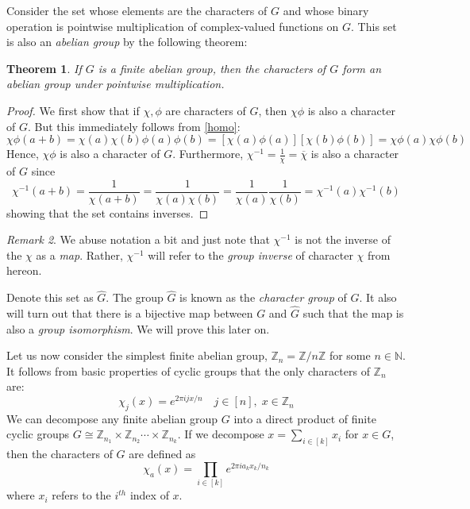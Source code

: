 \documentclass{amsart}
\newtheorem{theorem}{Theorem}[section]
\theoremstyle{definition}
\theoremstyle{remark}
\newtheorem{remark}[theorem]{Remark}
\numberwithin{equation}{section}
\theoremstyle{remark}
\begin{document}
Consider the set whose elements are the characters of $G$ and whose binary operation is pointwise multiplication of complex-valued functions on $G$. This set is also an \emph{abelian group} by the following theorem:
%
\begin{theorem}
  If $G$ is a finite abelian group, then the characters of $G$ form an abelian group under pointwise multiplication.
\end{theorem}
%
\begin{proof}
  We first show that if $\chi, \phi$ are characters of $G$, then $\chi\phi$ is also a character of $G$. But this immediately follows from \ref{homo}:
  $$ \chi\phi(a+b) = \chi(a)\chi(b)\phi(a)\phi(b) = [\chi(a)\phi(a)][\chi(b)\phi(b)] = \chi\phi(a)\chi\phi(b)$$
  Hence, $\chi\phi$ is also a character of $G$. Furthermore, $\chi^{-1} = \frac{1}{\chi} = \overline{\chi}$ is also a character of $G$ since
  $$ \chi^{-1}(a+b) = \frac{1}{\chi(a+b)} = \frac{1}{\chi(a)\chi(b)} = \frac{1}{\chi(a)}\frac{1}{\chi(b)} = \chi^{-1}(a)\chi^{-1}(b)$$
  showing that the set contains inverses.
\end{proof}
%
\begin{remark}
  We abuse notation a bit and just note that $\chi^{-1}$ is not the inverse of the $\chi$ as a \emph{map}. Rather, $\chi^{-1}$ will refer to the \emph{group inverse} of character $\chi$ from hereon.
\end{remark}

%
Denote this set as $\hat{G}$. The group $\hat{G}$ is known as the \emph{character group} of $G$. It also will turn out that there is a bijective map between $G$ and $\hat{G}$ such that the map is also a \emph{group isomorphism}. We will prove this later on. \newline

Let us now consider the simplest finite abelian group, $\mathbb{Z}_n = \mathbb{Z}/n\mathbb{Z}$ for some $n \in \mathbb{N}$. It follows from basic properties of cyclic groups that the only characters of $\mathbb{Z}_n$ are:
%
\begin{equation}
  \chi_j(x) = e^{ 2\pi i jx/n} \quad j \in [n], \; x \in \mathbb{Z}_n
\end{equation}
%
We can decompose any finite abelian group $G$ into a direct product of finite cyclic groups $G \cong \mathbb{Z}_{n_1} \times \mathbb{Z}_{n_2} \cdots \times\mathbb{Z}_{n_k}$. If we decompose $x = \sum_{i \in [k]} x_i$ for $x \in G$, then the characters of $G$ are defined as
%
\begin{equation}
  \chi_a(x) = \prod_{i \in [k]} e^{2 \pi i a_k x_k/ n_k}
\end{equation}
where $x_i$ refers to the $i^{th}$ index of $x$. \newline
\end{document}
